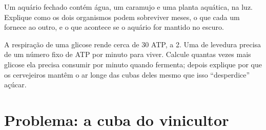 \begin{exercise}[$\star\star\star$]\label{exo:g10:cell-metabolism:14}
Um aquário fechado contém água, um caramujo e uma planta aquática, na
luz. Explique como os dois organismos podem sobreviver meses, o que
cada um fornece ao outro, e o que acontece se o aquário for mantido no
escuro.
\end{exercise}

\begin{exercise}[$\star\star\star$]\label{exo:g10:cell-metabolism:15}
A respiração de uma glicose rende cerca de 30 ATP, a  2. Uma
 de levedura precisa de um número fixo de ATP por minuto para
viver. Calcule quantas vezes mais glicose ela precisa consumir por
minuto quando fermenta; depois explique por que os cervejeiros mantêm o
ar longe das cubas deles mesmo que isso ``desperdice'' açúcar.
\end{exercise}

\section{Problema: a cuba do vinicultor}

